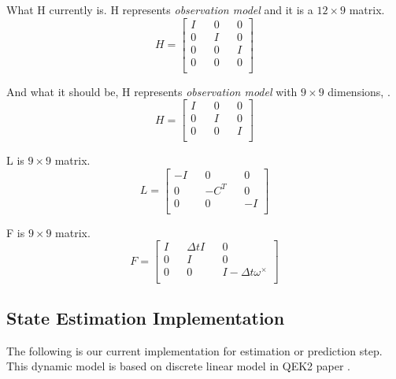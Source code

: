 \documentclass[letterpaper, 10 pt, conference]{ieeeconf}  %
\newcommand{\transpose}[1]{\ensuremath{#1^{\scriptscriptstyle T}}}
\begin{document}
What H currently is.
H represents \textit{observation model} and it is a \(12 \times 9\) matrix.
\begin{equation}
H =
\begin{bmatrix}
        I && 0 && 0  \\
        0 && I && 0  \\
        0 && 0 && I  \\
        0 && 0 && 0  \\
\end{bmatrix}
\end{equation}

And what it should be,
H represents \textit{observation model} with \(9 \times 9\) dimensions,  .
\begin{equation}
H =
\begin{bmatrix}
        I && 0 && 0  \\
        0 && I && 0  \\
        0 && 0 && I  \\
\end{bmatrix}
\end{equation}

L is \(9 \times 9\) matrix.
\begin{equation}
L =
\begin{bmatrix}
        -I && 0 && 0  \\
        0 && -\transpose{C} && 0  \\
        0 && 0 && -I  \\
\end{bmatrix}
\end{equation}


F is \(9 \times 9\) matrix.
\begin{equation}
F =
\begin{bmatrix}
        I && \Delta t   I && 0  \\
        0 && I && 0  \\
        0 && 0 && I- \Delta t \omega^{\times}  \\
\end{bmatrix}
\end{equation}


\subsection{State Estimation Implementation}
The following is our current implementation for estimation or prediction step.
This dynamic model is based on discrete linear model in QEK2 paper
\cite{rotella2014state}.
\end{document}
